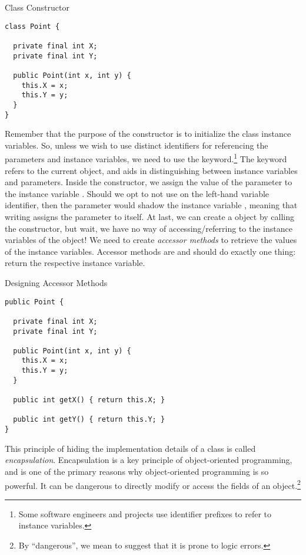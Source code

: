 \begin{cl}{ Class Constructor}
\begin{lstlisting}[language=MyJava]
class Point {
  
  private final int X;
  private final int Y;
  
  public Point(int x, int y) {
    this.X = x;
    this.Y = y;
  }
}
\end{lstlisting}
\end{cl}
Remember that the purpose of the constructor is to initialize the class instance variables. So, unless we wish to use distinct identifiers for referencing the parameters and instance variables, we need to use the  keyword.\footnote{Some software engineers and projects use identifier prefixes to refer to instance variables.} The  keyword refers to the current object, and aids in distinguishing between instance variables and parameters. Inside the constructor, we assign the value of the parameter  to the instance variable . Should we opt to not use  on the left-hand variable identifier, then the parameter  would shadow the instance variable , meaning that writing  assigns the parameter to itself. At last, we can create a  object by calling the constructor, but wait, we have no way of accessing/referring to the instance variables of the  object! We need to create \textit{accessor methods} to retrieve the values of the instance variables. Accessor methods are  and should do exactly one thing: return the respective instance variable.

\begin{cl}{Designing Accessor Methods}
\begin{lstlisting}[language=MyJava]
public Point {

  private final int X;
  private final int Y;
  
  public Point(int x, int y) {
    this.X = x;
    this.Y = y;
  }
  
  public int getX() { return this.X; }
  
  public int getY() { return this.Y; }
}
\end{lstlisting}
\end{cl}

This principle of hiding the implementation details of a class is called \textit{encapsulation}. Encapsulation is a key principle of object-oriented programming, and is one of the primary reasons why object-oriented programming is so powerful. It can be dangerous to directly modify or access the fields of an object.\footnote{By ``dangerous'', we mean to suggest that it is prone to logic errors.} 

